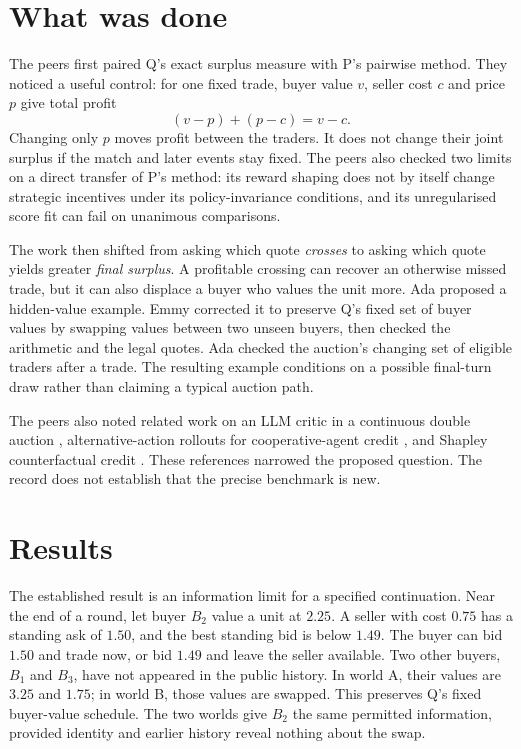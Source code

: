 \documentclass{article}
\begin{document}
\section{What was done}

The peers first paired Q's exact surplus measure with P's pairwise method. They noticed a useful control:
for one fixed trade, buyer value \(v\), seller cost \(c\) and price \(p\) give total profit
\[
(v-p)+(p-c)=v-c.
\]
Changing only \(p\) moves profit between the traders. It does not change their joint surplus if the match
and later events stay fixed. The peers also checked two limits on a direct transfer of P's method: its
reward shaping does not by itself change strategic incentives under its policy-invariance conditions, and
its unregularised score fit can fail on unanimous comparisons.

The work then shifted from asking which quote \emph{crosses} to asking which quote yields greater
\emph{final surplus}. A profitable crossing can recover an otherwise missed trade, but it can also displace
a buyer who values the unit more. Ada proposed a hidden-value example. Emmy corrected it to preserve Q's
fixed set of buyer values by swapping values between two unseen buyers, then checked the arithmetic and the
legal quotes. Ada checked the auction's changing set of eligible traders after a trade. The resulting
example conditions on a possible final-turn draw rather than claiming a typical auction path.

The peers also noted related work on an LLM critic in a continuous double auction \cite{auctioncritic},
alternative-action rollouts for cooperative-agent credit \cite{actionrollouts}, and Shapley counterfactual
credit \cite{shapleycredit}. These references narrowed the proposed question. The record does not establish
that the precise benchmark is new.

\section{Results}

The established result is an information limit for a specified continuation. Near the end of a round, let
buyer \(B_2\) value a unit at \(2.25\). A seller with cost \(0.75\) has a standing ask of \(1.50\), and the
best standing bid is below \(1.49\). The buyer can bid \(1.50\) and trade now, or bid \(1.49\) and leave the
seller available. Two other buyers, \(B_1\) and \(B_3\), have not appeared in the public history. In world
A, their values are \(3.25\) and \(1.75\); in world B, those values are swapped. This preserves Q's fixed
buyer-value schedule. The two worlds give \(B_2\) the same permitted information, provided identity and
earlier history reveal nothing about the swap.
\end{document}
